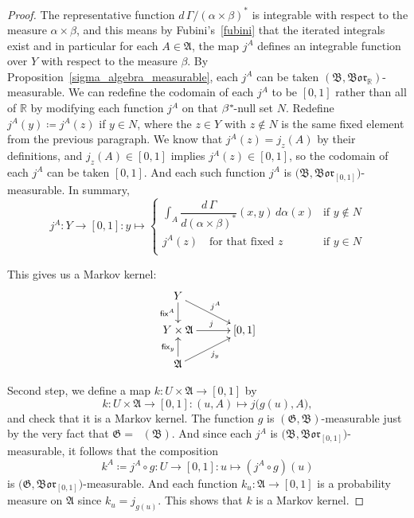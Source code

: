 \documentclass[
twoside=true,
paper=letter,
fontsize=9pt,
pagesize=auto,
leqno,
openany,
headsepline,
overfullrule,
]{scrbook}
\theoremstyle{plain}
\theoremstyle{plain}
\theoremstyle{definition}
\theoremstyle{bfnoteitalic}
\theoremstyle{bfnoteroman}
\newcommand{\sigalg}[1]{\mathfrak{#1}}
\newcommand{\definedby}{\coloneqq}
\newcommand{\sfop}[1]{\mathsf{#1}}
\newcommand{\borel}{\mathfrak{Bor}}
\newcommand{\preimage}[1]{\mathop{#1^{\leftarrow}}}
\newcommand{\R}{\mathbb{R}}
\newcommand{\sigmaalgebra}{\sigalg{A}}
\newcommand{\sigmaalgebraii}{\sigalg{B}}
\newcommand{\kernast}{\ast\kern-1pt}
\newcommand{\funcg}{g}
\newcommand{\funcj}{j}
\newcommand{\funck}{k}
\newcommand{\measurespaceii}{Y}
\newcommand{\mspaceelt}{x}
\newcommand{\mspaceeltii}{y}
\newcommand{\mspaceeltiii}{z}
\newcommand{\seti}{A}
\newcommand{\fixinthefirst}[1]{\sfop{fix}_{#1}}
\newcommand{\fixinthesecond}[1]{\sfop{fix}^{#1}}
\newcommand{\uspace}{U}%
\newcommand{\uspaceelt}{u}
\newcommand{\measonprod}{\Gamma}%
\newcommand{\marginalone}{\alpha}%
\newcommand{\marginaltwo}{\beta}%
\begin{document}
\begin{proof}
The representative function
$d\,\measonprod/(\marginalone\times\marginaltwo)^*$
is integrable with respect to the measure
$\marginalone\times\marginaltwo$, and this means  by Fubini's~\ref{fubini} that the iterated integrals exist and in particular for each
$\seti\in\sigmaalgebra$,
the map $\funcj^\seti$ defines an integrable function over
$\measurespaceii$ with respect to the measure $\marginaltwo$.
By Proposition~\ref{sigma_algebra_measurable}, each $\funcj^\seti$ can be taken
$(\sigmaalgebraii,\borel_\R)$\hyp{}measurable.
We can redefine the codomain of each
$\funcj^\seti$ to be $[0,1]$ rather than all of $\R$
by modifying each function $\funcj^\seti$ on that $\marginaltwo^\kernast$\hyp{}null set $N$.
Redefine
$\funcj^\seti(\mspaceeltii)
\definedby
\funcj^\seti(\mspaceeltiii)$ if $\mspaceeltii \in N$,
where the
$\mspaceeltiii\in\measurespaceii$ with $\mspaceeltiii\notin N$
is the same fixed element from the previous paragraph.
We know that
$\funcj^\seti(\mspaceeltiii)= \funcj_\mspaceeltiii(\seti)$ by their definitions,
and
$\funcj_\mspaceeltiii(\seti) \in [0,1]$
implies
$\funcj^\seti(\mspaceeltiii) \in [0,1]$,
so the codomain of each $j^\seti$ can be taken $[0,1]$. And each such function $\funcj^\seti$ is
$\bigl( \sigmaalgebraii, \borel_{[0,1]} \bigr)$\hyp{}measurable.
In summary,
\[
\funcj^\seti
:\measurespaceii \to [0,1]
:\mspaceeltii \mapsto
\begin{cases}
\displaystyle \int_\seti
\dfrac{d\,\measonprod}{d(\marginalone\times\marginaltwo)^*}
(\mspaceelt,\mspaceeltii)\, d\marginalone(\mspaceelt)
& \text{if $\mspaceeltii\notin N$}
\\
\funcj^\seti(\mspaceeltiii)  \quad\text{for that fixed $\mspaceeltiii$}
& \text{if $\mspaceeltii \in N$}
\\
\end{cases}
\]

This gives us a Markov kernel:
\[
\xymatrix@R=16pt@C=30pt{
\measurespaceii
\ar[d]_-{\fixinthesecond{\seti}}
\ar[dr]^{\funcj^\seti} &
\\
\measurespaceii\times\sigmaalgebra \ar[r]^{\funcj} & [0,1]
\\
\sigmaalgebra
\ar[ur]_{\funcj_\mspaceeltii}
\ar[u]^{\fixinthefirst{\mspaceeltii}} &
\\
}
\]

Second step, we define a map
$\funck: \uspace\times \sigmaalgebra \to [0,1]$
by
\[
\funck: \uspace\times \sigmaalgebra \to [0,1] :
(\uspaceelt,\seti) \mapsto \funcj\bigl(\funcg(\uspaceelt),\seti\bigr),
\]
and check that it is a Markov kernel.
The function $\funcg$ is
$(\sigalg{G},\sigmaalgebraii)$\hyp{}measurable just by the very fact that
$\sigalg{G} = \preimage{\funcg}(\sigmaalgebraii)$. And since each
$\funcj^\seti$ is
$\bigl( \sigmaalgebraii, \borel_{[0,1]} \bigr)$\hyp{}measurable, it follows that the composition
\[
\funck^\seti\definedby\funcj^\seti\circ\funcg
: \uspace \to [0,1]
:\uspaceelt \mapsto (\funcj^\seti\circ\funcg)(\uspaceelt)
\]
is
$\bigl( \sigalg{G}, \borel_{[0,1]} \bigr)$\hyp{}measurable.
And each function
$\funck_\uspaceelt : \sigmaalgebra \to [0,1]$ is a probability measure on
$\sigmaalgebra$ since
$\funck_\uspaceelt = \funcj_{\funcg(\uspaceelt)}$.
This shows that $\funck$ is a Markov kernel.


\end{proof}
\end{document}
